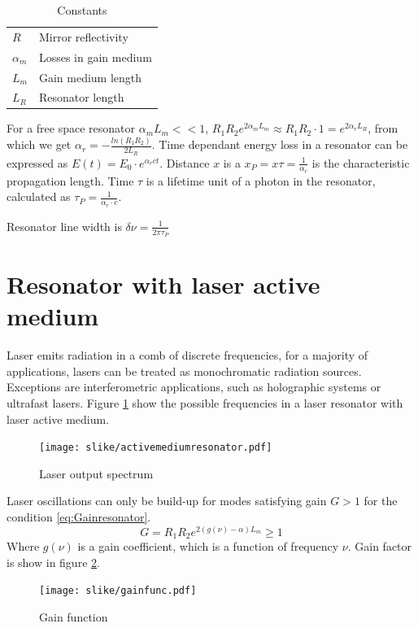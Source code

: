 \begin{table}[h!]
    \centering
    \begin{tabular}{|l|p{2in}|}
        \hline
        $R$ & Mirror reflectivity \\
        $\alpha_m$ & Losses in gain medium \\
        $L_m$ & Gain medium length\\
        $L_R$  & Resonator length \\
        \hline
    \end{tabular}
    \caption{Constants}
    \label{tab:losses}
\end{table} 
For a free space resonator $\alpha_m L_m << 1$, $R_1 R_2 e^{2 \alpha_m L_m} \approx R_1 R_2 \cdot 1 =  e^{2 \alpha_r L_R}$, from which  we get 
$\alpha_r = -\frac{ln(R_1 R_2)}{2 L_R}$.
Time dependant energy loss in a resonator can be expressed as $E(t) = E_0 \cdot e^{\alpha_r c t}$. Distance $x$ is a $x_P = x \tau = \frac{1}{\alpha_r}$ is the characteristic propagation length.
Time $\tau$ is a lifetime unit of a photon in the resonator, calculated as $\tau_P = \frac{1}{\alpha_r \cdot c}$.

Resonator line width is $\delta \nu = \frac{1}{2 \pi \tau_P}$

\section{Resonator with laser active medium}
Laser emits radiation in a comb of discrete frequencies, for a majority of applications, lasers can be 
treated as monochromatic radiation sources. Exceptions are interferometric applications, such as holographic systems or ultrafast lasers.
Figure \ref{fig:lamr} show the possible frequencies in a laser resonator with laser active medium.

\begin{figure}[h!]
    \centering
    \texttt{[image: slike/activemediumresonator.pdf]}
    \caption{Laser output spectrum}
    \label{fig:lamr}
\end{figure}

Laser oscillations can only be build-up for modes satisfying gain $G > 1$ for the condition \ref{eq:Gainresonator}.
\begin{equation}
    G = R_1 R_2 e^{2(g(\nu) - \alpha) L_m} \ge 1
    \label{eq:Gainresonator}
\end{equation}
Where $g(\nu)$ is a gain coefficient, which is a function of frequency $\nu$.
Gain factor is show in figure \ref{fig:gainfunc}.
\begin{figure}[h!]
    \centering
    \texttt{[image: slike/gainfunc.pdf]}
    \caption{Gain function}
    \label{fig:gainfunc}
\end{figure}

